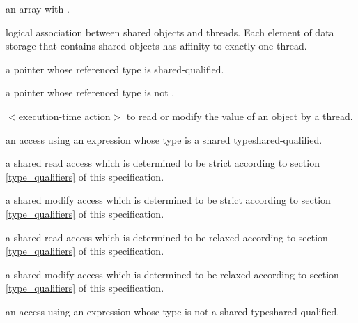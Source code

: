 %
     an array with .
  
%
     logical association between shared
     objects and threads.  Each 
     {element of data storage that contains shared objects} has affinity
     to exactly one thread.
 
%
     a pointer whose referenced type is 
     {shared-qualified}.

%
     a pointer whose referenced type is not .

\label{def-access}
%
     $<$execution-time action$>$ to read or
     modify the value of an object by a thread.

%
     an access using an expression whose type is 
     {a shared type}{shared-qualified}.

%
     a shared read access which is determined to be
     strict according to section \ref{type_qualifiers} of this specification.

%
     a shared modify access which is determined to be
     strict according to section \ref{type_qualifiers} of this specification.

%
     a shared read access which is determined to be
     relaxed according to section \ref{type_qualifiers} of this specification.

%
     a shared modify access which is determined to be
     relaxed according to section \ref{type_qualifiers} of this specification.

%
     an access using an expression whose type is not 
     {a shared type}{shared-qualified}.


